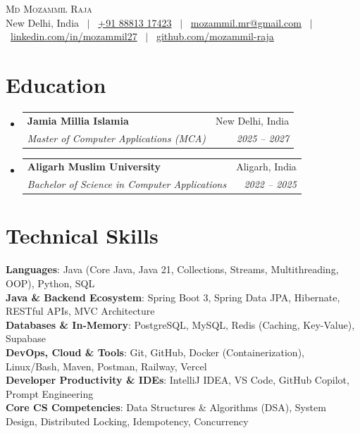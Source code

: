 \documentclass[letterpaper,10.5pt]{article}
\makeatletter
\newcommand{\resumeSubheading}[4]{
  \vspace{-1.5pt}\item
    \begin{tabular*}{0.99\textwidth}[t]{l@{\extracolsep{\fill}}r}
      \textbf{#1} & #2 \\
      \textit{\small#3} & \textit{\small #4} \\
    \end{tabular*}\vspace{-5pt}
}
\newcommand{\resumeSubHeadingListStart}{\begin{itemize}[leftmargin=0.15in, label={}]}
\newcommand{\resumeSubHeadingListEnd}{\end{itemize}}
\makeatother
\begin{document}
\begin{center}
    {\Huge \scshape Md Mozammil Raja} \\ \vspace{3pt}
    \small New Delhi, India \ $|$ \ 
    \href{tel:+918881317423}{+91 88813 17423} \ $|$ \ 
    \href{mailto:mozammil.mr@gmail.com}{mozammil.mr@gmail.com} \ $|$ \ 
    \href{https://linkedin.com/in/mozammil27}{linkedin.com/in/mozammil27} \ $|$ \ 
    \href{https://github.com/mozammil-raja}{github.com/mozammil-raja}
\end{center}

\section{Education}
  \resumeSubHeadingListStart
    \resumeSubheading
      {Jamia Millia Islamia}{New Delhi, India}
      {Master of Computer Applications (MCA)}{2025 -- 2027}
    \resumeSubheading
      {Aligarh Muslim University}{Aligarh, India}
      {Bachelor of Science in Computer Applications \normalfont{(CGPA: 7.99 / 10.0)}}{2022 -- 2025}
  \resumeSubHeadingListEnd

\section{Technical Skills}
 \begin{itemize}[leftmargin=0.15in, label={}]
    \small{\item{
     \textbf{Languages}{: Java (Core Java, Java 21, Collections, Streams, Multithreading, OOP), Python, SQL} \\ \vspace{1pt}
     \textbf{Java \& Backend Ecosystem}{: Spring Boot 3, Spring Data JPA, Hibernate, RESTful APIs, MVC Architecture} \\ \vspace{1pt}
     \textbf{Databases \& In-Memory}{: PostgreSQL, MySQL, Redis (Caching, Key-Value), Supabase} \\ \vspace{1pt}
     \textbf{DevOps, Cloud \& Tools}{: Git, GitHub, Docker (Containerization), Linux/Bash, Maven, Postman, Railway, Vercel} \\ \vspace{1pt}
     \textbf{Developer Productivity \& IDEs}{: IntelliJ IDEA, VS Code, GitHub Copilot, Prompt Engineering} \\ \vspace{1pt}
     \textbf{Core CS Competencies}{: Data Structures \& Algorithms (DSA), System Design, Distributed Locking, Idempotency, Concurrency}
    }}
 \end{itemize}
 \vspace{-10pt}
\end{document}
